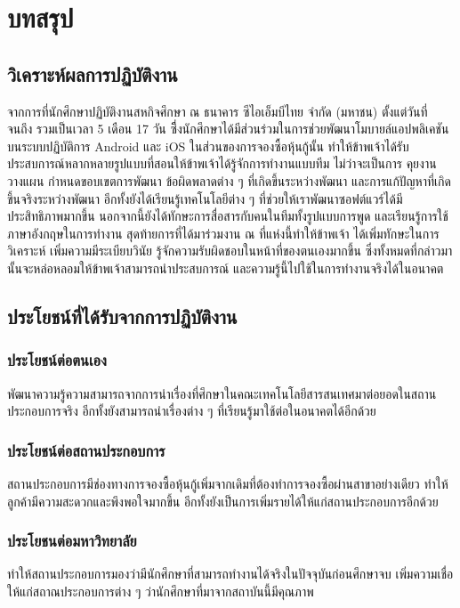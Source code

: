 \chapter{บทสรุป}
\thispagestyle{empty}
\label{chapter:conclusion}

\section{วิเคราะห์ผลการปฏิบัติงาน}
จากการที่นักศึกษาปฏิบัติงานสหกิจศึกษา ณ ธนาคาร ซีไอเอ็มบีไทย จำกัด (มหาชน) ตั้งแต่วันที่ \StartDWork จนถึง \EndDWork 
รวมเป็นเวลา 5 เดือน 17 วัน ซึี่งนักศึกษาได้มีส่วนร่วมในการช่วยพัฒนาโมบายล์แอปพลิเคชันบนระบบปฏิบัติการ Android และ iOS
ในส่วนของการจองซื้อหุ้นกู้นั้น ทำให้ข้าพเจ้าได้รับประสบการณ์หลากหลายรูปแบบที่สอนให้ข้าพเจ้าได้รู้จักการทำงานแบบทีม ไม่ว่าจะเป็นการ
คุยงาน วางแผน กำหนดขอบเขตการพัฒนา ข้อผิดพลาดต่าง ๆ ที่เกิดขึ้นระหว่างพัฒนา และการแก้ปัญหาที่เกิดขึ้นจริงระหว่างพัฒนา 
อีกทั้งยังได้เรียนรู้เทคโนโลยีต่าง ๆ ที่ช่วยให้เราพัฒนาซอฟต์แวร์ได้มีประสิทธิภาพมากขึ้น นอกจากนี้ยังได้ทักษะการสื่อสารกับคนในทีมทั้งรูปแบบการพูด
และเรียนรู้การใช้ภาษาอังกฤษในการทำงาน สุดท้ายการที่ได้มาร่วมงาน ณ ที่แห่งนี้ทำให้ข้าพเจ้า ได้เพิ่มทักษะในการวิเคราะห์ เพิ่มความมีระเบียบวินัย
รู้จักความรับผิดชอบในหน้าที่ของตนเองมากขึ้น ซึ่งทั้งหมดที่กล่าวมานั้นจะหล่อหลอมให้ข้าพเจ้าสามารถนำประสบการณ์ และความรู้นี้ไปใช้ในการทำงานจริงได้ในอนาคต

\section{ประโยชน์ที่ได้รับจากการปฏิบัติงาน}
\subsection{ประโยชน์ต่อตนเอง} 
พัฒนาความรู้ความสามารถจากการนำเรื่องที่ศึกษาในคณะเทคโนโลยีสารสนเทศมาต่อยอดในสถานประกอบการจริง
อีกทั้งยังสามารถนำเรื่องต่าง ๆ ที่เรียนรู้มาใช้ต่อในอนาคตได้อีกด้วย

\subsection{ประโยชน์ต่อสถานประกอบการ}
สถานประกอบการมีช่องทางการจองซื้อหุ้นกู้เพิ่มจากเดิมที่ต้องทำการจองซื้อผ่านสาขาอย่างเดียว ทำให้ลูกค้ามีความสะดวกและพึงพอใจมากขึ้น
อีกทั้งยังเป็นการเพิ่มรายได้ให้แก่สถานประกอบการอีกด้วย

\subsection{ประโยชนต่อมหาวิทยาลัย}
ทำให้สถานประกอบการมองว่ามีนักศึกษาที่สามารถทำงานได้จริงในปัจจุบันก่อนศึกษาจบ 
เพิ่มความเชื่อให้แก่สถาณประกอบการต่าง ๆ ว่านักศึกษาที่มาจากสถาบันนี้มีคุณภาพ

